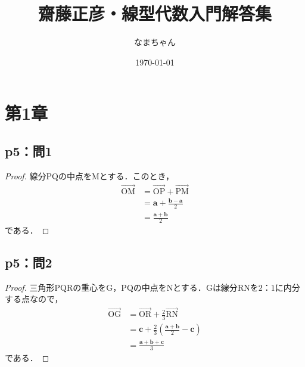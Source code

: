\documentclass[uplatex,dvipdfmx,a4paper,10pt,fleqn]{jsarticle}
\begin{document}
\title{齋藤正彦・線型代数入門解答集}
\author{なまちゃん}
\date{\today}
\maketitle
\begin{multicols*}{3}
    \tableofcontents
\end{multicols*}
\newpage
\section*{第1章}

\subsection*{p5：問1}

\begin{tleftbar}
    \begin{proof}
		線分$\mathrm{PQ}$の中点を$\mathrm{M}$とする．このとき，
		\begin{align*}
		\overrightarrow{\mathrm{OM}} & = \overrightarrow{\mathrm{OP}} + \overrightarrow{\mathrm{PM}} \\
		& = \bm{a} + \frac{\bm{b}-\bm{a}}{2} \\
		& = \frac{\bm{a}+\bm{b}}{2}
		\end{align*}
		である．
	\end{proof}
\end{tleftbar}
\subsection*{p5：問2}
\begin{tleftbar}
	\begin{proof}
		三角形$\mathrm{PQR}$の重心を$\mathrm{G}$，$\mathrm{PQ}$の中点を$\mathrm{N}$とする．$\mathrm{G}$は線分$\mathrm{RN}$を$2：1$に内分する点なので，
		\begin{align*}
			\overrightarrow{\mathrm{OG}} &= \overrightarrow{\mathrm{OR}} + \frac{2}{3} \overrightarrow{\mathrm{RN}} \\
			& = \bm{c}+ \frac{2}{3} \left (\frac{\bm{a}+\bm{b}}{2}-\bm{c} \right) \\
			& = \frac{\bm{a}+\bm{b}+\bm{c}}{3}
		\end{align*}
		である．
	\end{proof}
\end{tleftbar}
\end{document}
